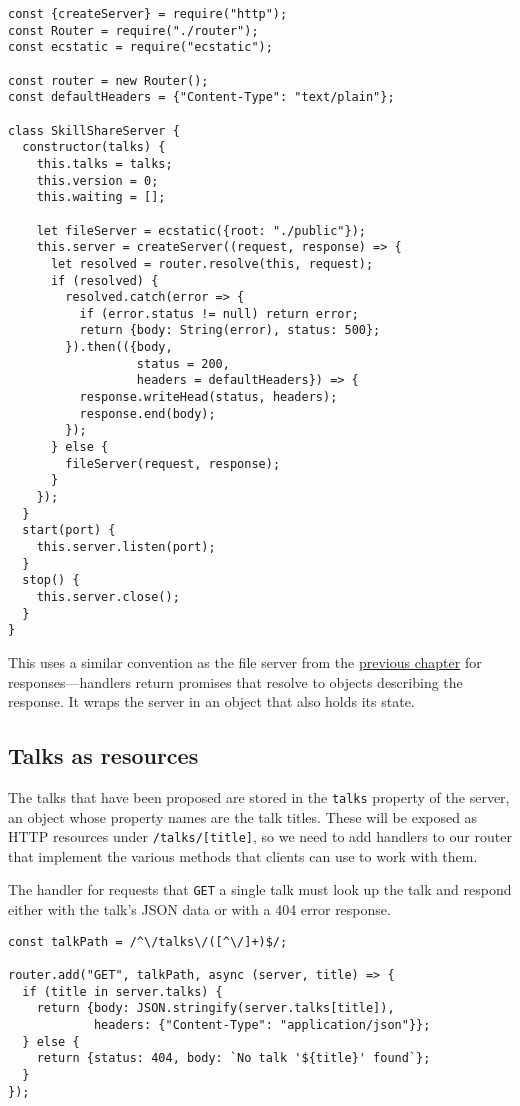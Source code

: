 \begin{lstlisting}
const {createServer} = require("http");
const Router = require("./router");
const ecstatic = require("ecstatic");

const router = new Router();
const defaultHeaders = {"Content-Type": "text/plain"};

class SkillShareServer {
  constructor(talks) {
    this.talks = talks;
    this.version = 0;
    this.waiting = [];

    let fileServer = ecstatic({root: "./public"});
    this.server = createServer((request, response) => {
      let resolved = router.resolve(this, request);
      if (resolved) {
        resolved.catch(error => {
          if (error.status != null) return error;
          return {body: String(error), status: 500};
        }).then(({body,
                  status = 200,
                  headers = defaultHeaders}) => {
          response.writeHead(status, headers);
          response.end(body);
        });
      } else {
        fileServer(request, response);
      }
    });
  }
  start(port) {
    this.server.listen(port);
  }
  stop() {
    this.server.close();
  }
}
\end{lstlisting}
\noindent

This uses a similar convention as the file server from the \hyperref[node]{previous chapter} for responses—handlers return promises that resolve to objects describing the response. It wraps the server in an object that also holds its state.

\subsection{Talks as resources}

The talks that have been proposed are stored in the \lstinline`talks` property of the server, an object whose property names are the talk titles. These will be exposed as HTTP resources under \lstinline`/talks/[title]`, so we need to add handlers to our router that implement the various methods that clients can use to work with them.

The handler for requests that \lstinline`GET` a single talk must look up the talk and respond either with the talk's JSON data or with a 404 error response.

\begin{lstlisting}
const talkPath = /^\/talks\/([^\/]+)$/;

router.add("GET", talkPath, async (server, title) => {
  if (title in server.talks) {
    return {body: JSON.stringify(server.talks[title]),
            headers: {"Content-Type": "application/json"}};
  } else {
    return {status: 404, body: `No talk '${title}' found`};
  }
});
\end{lstlisting}
\noindent{}

